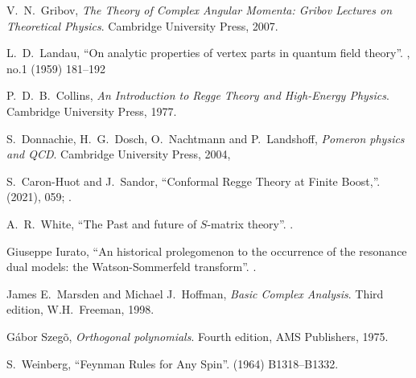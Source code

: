 \begin{thebibliography}{99}
V.~N.~Gribov,
\emph{The Theory of Complex Angular Momenta: Gribov Lectures on Theoretical Physics}.
Cambridge University Press, 2007.\newline
{\tt{}}

L.~D.~Landau,
``On analytic properties of vertex parts in quantum field theory''.
 , no.1 (1959) 181--192\newline
{\tt{}}

P.~D.~B.~Collins,
\textit{An Introduction to Regge Theory and High-Energy Physics}.
Cambridge University Press, 1977.\newline
{\tt{}}

S.~Donnachie, H.~G.~Dosch, O.~Nachtmann and P.~Landshoff,
\emph{Pomeron physics and QCD}.
Cambridge University Press, 2004,

S.~Caron-Huot and J.~Sandor,
``Conformal Regge Theory at Finite Boost,''.
  (2021), 059; .\newline
{\tt{}}

A.~R.~White,
``The Past and future of $S$-matrix theory''.
.

  Giuseppe Iurato,
  ``An historical prolegomenon to the occurrence of the resonance dual models: the Watson-Sommerfeld transform''.
  .
  
  James E.~Marsden and Michael J.~Hoffman,
  \emph{Basic Complex Analysis}.
  Third edition, W.H.~Freeman, 1998.

  G\'abor Szeg\~o,
  \emph{Orthogonal polynomials}.
  Fourth edition, AMS Publishers, 1975.

S.~Weinberg,
``Feynman Rules for Any Spin''.
  (1964) B1318--B1332.\newline
{\tt{}}


\end{thebibliography}
